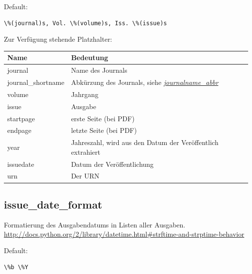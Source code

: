 \documentclass[a4paper,10pt,ngerman]{sphinxmanual}
\begin{document}
Default:

\begin{Verbatim}[commandchars=\\\{\}]
\%(journal)s, Vol. \%(volume)s, Iss. \%(issue)s
\end{Verbatim}

Zur Verfügung stehende Platzhalter:

\begin{tabulary}{\linewidth}{|L|L|}
\hline
\textbf{
Name
} & \textbf{
Bedeutung
}\\\hline

journal
 & 
Name des Journals
\\\hline

journal\_shortname
 & 
Abkürzung des Journals, siehe {\hyperref[metadata_properties:prop-journalname-abbr]{\emph{journalname\_abbr}}}
\\\hline

volume
 & 
Jahrgang
\\\hline

issue
 & 
Ausgabe
\\\hline

startpage
 & 
erste Seite (bei PDF)
\\\hline

endpage
 & 
letzte Seite (bei PDF)
\\\hline

year
 & 
Jahreszahl, wird aus den Datum der Veröffentlich extrahiert
\\\hline

issuedate
 & 
Datum der Veröffentlichung
\\\hline

urn
 & 
Der URN
\\\hline
\end{tabulary}



\subsection{issue\_date\_format}
\label{dipp_properties:prop-issue-date-format}\label{dipp_properties:issue-date-format}
Formatierung des Ausgabendatums in Listen aller Ausgaben. \href{http://docs.python.org/2/library/datetime.html\#strftime-and-strptime-behavior}{http://docs.python.org/2/library/datetime.html\#strftime-and-strptime-behavior}

Default:

\begin{Verbatim}[commandchars=\\\{\}]
\%b \%Y
\end{Verbatim}
\end{document}
